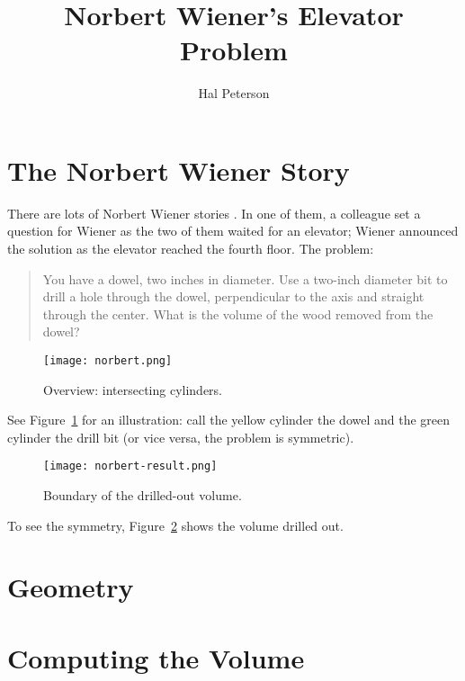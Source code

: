 \documentclass[twocolumn]{article}
\title{Norbert Wiener's Elevator Problem}
\author{Hal Peterson}
\theoremstyle{definition}
\theoremstyle{plain}
\begin{document}
\maketitle

\section{The Norbert Wiener Story}

There are lots of Norbert Wiener stories \cite{Hardesty2021}.  In one
of them, a colleague 
set a question for Wiener as the two of them waited for an elevator;
Wiener announced the solution as the elevator reached the fourth
floor.  The problem:
\begin{quotation}
  You have a dowel, two inches in diameter.  Use a two-inch diameter
  bit to drill a hole through the dowel, perpendicular to the axis and
  straight through the center.  What is the volume of the wood removed
  from the dowel?
\end{quotation}

\begin{figure}
  \texttt{[image: norbert.png]}
  \caption{Overview:  intersecting cylinders.}
  \label{fig:overview}
\end{figure}

See Figure~\ref{fig:overview} for an illustration:  call the yellow
cylinder the dowel and the green cylinder the drill bit (or vice
versa, the problem is symmetric).

\begin{figure}
  \texttt{[image: norbert-result.png]}
  \caption{Boundary of the drilled-out volume.}
  \label{fig:boundary}
\end{figure}

To see the symmetry, Figure~\ref{fig:boundary} shows the volume
drilled out.

\section{Geometry}

\section{Computing the Volume}



\end{document}
